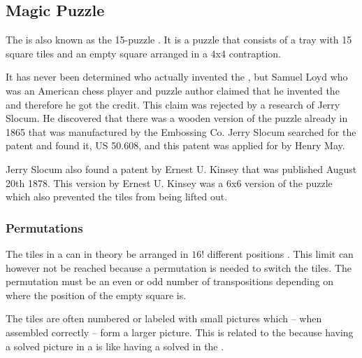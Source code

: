 \subsection{Magic Puzzle}
\label{sub:magicPuzzle}
The \mpuzzle{} is also known as the 15-puzzle \cite[pp. 48-50]{Larsen81}. It is a puzzle that consists of a tray with 15 square tiles and an empty square arranged in a 4x4 contraption.

It has never been determined who actually invented the \mpuzzle{}, but Samuel Loyd who was an American chess player and puzzle author claimed that he invented the \mpuzzle{} and therefore he got the credit. This claim was rejected by a research of Jerry Slocum. He discovered that there was a wooden version of the puzzle already in 1865 that was manufactured by the Embossing Co. Jerry Slocum searched for the patent and found it, US 50.608, and this patent was applied for by Henry May.

Jerry Slocum also found a patent by Ernest U. Kinsey that was published August 20th 1878. This version by Ernest U. Kinsey was a 6x6 version of the puzzle which also prevented the tiles from being lifted out.

\subsubsection {Permutations}
The tiles in a \mpuzzle{} can in theory be arranged in $16!$ different positions \cite{jaapsch}. This limit can however not be reached because a permutation is needed to switch the tiles. The permutation must be an even or odd number of transpositions depending on where the position of the empty square is.

The tiles are often numbered or labeled with small pictures which -- when assembled correctly -- form a larger picture.
This is related to the \rubik{} because having a solved picture in a \mpuzzle{} is like having a solved \face{} in the \rubik{}.

